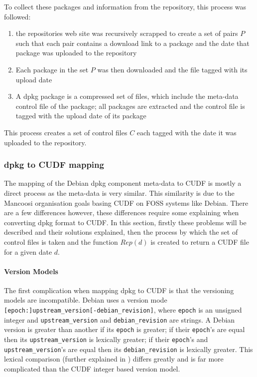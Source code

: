 To collect these packages and information from the repository, this process was followed:
\begin{enumerate}
  \item the repositories web site was recursively scrapped to create a set of pairs $P$ 
  such that each pair contains a download link to a package and the date that package was uploaded to the repository
  \item Each package in the set $P$ was then downloaded and the file tagged with its upload date
  \item A dpkg package is a compressed set of files, 
  which include the meta-data control file of the package; all packages are extracted and the control file is tagged with the upload date of its package 
\end{enumerate}

This process creates a set of control files $C$ each tagged with the date it was uploaded to the repository.

\subsubsection{dpkg to CUDF mapping}
\label{ubuntusimulation.debtocudf}
The mapping of the Debian dpkg component meta-data to CUDF is mostly a direct process as the meta-data is very similar.
This similarity is due to the Mancoosi organisation goals basing CUDF on FOSS systems like Debian.  
There are a few differences however, these differences require some explaining when converting dpkg format to CUDF.
In this section, firstly these problems will be described and their solutions explained, 
then the process by which the set of control files is taken and the function $Rep(d)$ is created to return a CUDF file for a given date $d$.

\paragraph{Version Models}
The first complication when mapping dpkg to CUDF is that the versioning models are incompatible.
Debian uses a version mode \verb+[epoch:]upstream_version[-debian_revision]+,
where \verb+epoch+ is an unsigned integer and \verb+upstream_version+ and \verb+debian_revision+ are strings.
A Debian version is greater than another if its \verb+epoch+ is greater; 
if their \verb+epoch+'s are equal then its \verb+upstream_version+ is lexically greater; 
if their \verb+epoch+'s and \verb+upstream_version+'s are equal then its \verb+debian_revision+ is lexically greater.
This lexical comparison (further explained in \citep{Barth2005}) differs greatly and is far more complicated than the CUDF integer based version model.

